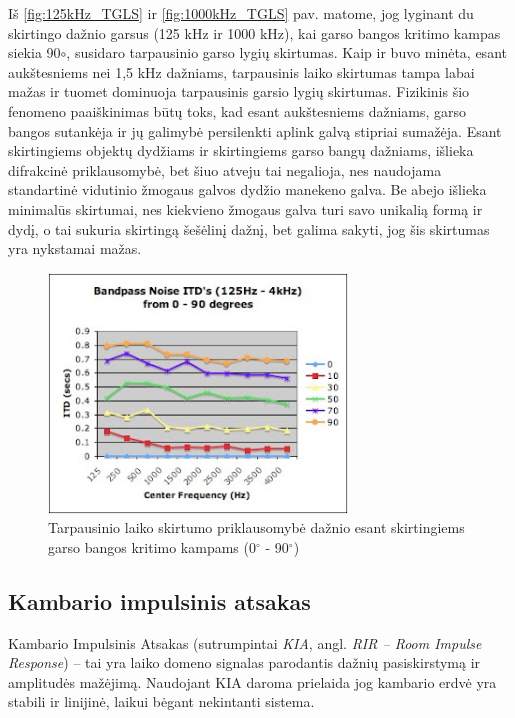 \documentclass[]{vgtuef}
\begin{document}
Iš \ref{fig:125kHz_TGLS} ir \ref{fig:1000kHz_TGLS} pav. matome, jog lyginant du skirtingo dažnio garsus (125 kHz ir 1000 kHz), kai garso bangos kritimo kampas siekia 90$\circ$, susidaro tarpausinio garso lygių skirtumas. Kaip ir buvo minėta, esant aukštesniems nei 1,5 kHz dažniams, tarpausinis laiko skirtumas tampa labai mažas ir tuomet dominuoja tarpausinis garsio lygių skirtumas. Fizikinis šio fenomeno paaiškinimas būtų toks, kad esant aukštesniems dažniams, garso bangos sutankėja ir jų galimybė persilenkti aplink galvą stipriai sumažėja. Esant skirtingiems objektų dydžiams ir skirtingiems garso bangų dažniams, išlieka difrakcinė priklausomybė, bet šiuo atveju tai negalioja, nes naudojama standartinė vidutinio žmogaus galvos dydžio manekeno galva. Be abejo išlieka minimalūs skirtumai, nes kiekvieno žmogaus galva turi savo unikalią formą ir dydį, o tai sukuria skirtingą šešėlinį dažnį, bet galima sakyti, jog šis skirtumas yra nykstamai mažas.

\begin{figure}[!h]
  \centering
  \includegraphics[width=300px]{img/ITD_freq.png}
  \caption{Tarpausinio laiko skirtumo priklausomybė dažnio esant skirtingiems garso bangos kritimo kampams (0$^\circ$ - 90$^\circ$)}
  \label{fig:ITD_freq}
\end{figure}


\subsection{Kambario impulsinis atsakas}
\label{sect:KIA}

Kambario Impulsinis Atsakas (sutrumpintai \textit{KIA}, angl. \textit{RIR – Room Impulse Response}) – tai yra laiko domeno signalas parodantis dažnių pasiskirstymą ir amplitudės mažėjimą. Naudojant KIA daroma prielaida jog kambario erdvė yra stabili ir linijinė, laikui bėgant nekintanti sistema.
\end{document}
